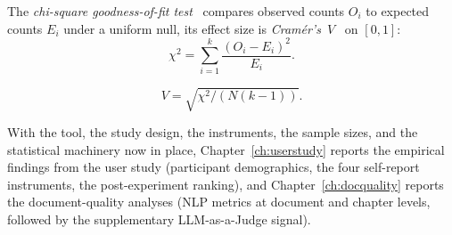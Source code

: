 The \emph{chi-square goodness-of-fit test}~\cite{Pearson1900} compares observed counts $O_i$ to expected counts $E_i$ under a uniform null,
its effect size is \emph{Cram\'{e}r's~$V$}~\cite{Cramer1946} on $[0, 1]$:
\begin{equation}
\chi^2 = \sum_{i=1}^{k} \frac{(O_i - E_i)^2}{E_i}.
\end{equation}

\begin{equation}
V = \sqrt{\chi^2 / (N (k - 1))}.
\end{equation}

\bigskip

With the tool, the study design, the instruments, the sample
sizes, and the statistical machinery now in place,
Chapter~\ref{ch:userstudy} reports the empirical findings from
the user study (participant demographics, the four self-report
instruments, the post-experiment ranking), and
Chapter~\ref{ch:docquality} reports the document-quality analyses
(NLP metrics at document and chapter levels, followed by the
supplementary LLM-as-a-Judge signal).
